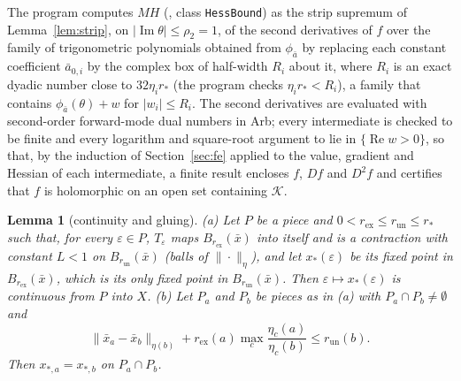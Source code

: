 \documentclass[11pt]{article}
\newtheorem{lemma}{Lemma}[section]
\theoremstyle{definition}
\newcommand{\re}{\operatorname{Re}}
\newcommand{\im}{\operatorname{Im}}
\begin{document}
The program computes $M\!H$ (, class \texttt{HessBound}) as the strip supremum of Lemma~\ref{lem:strip}, on $|\im\theta| \le \rho_2 = 1$, of the second derivatives of $f$ over the family of trigonometric polynomials obtained from $\phi_{\bar a}$ by replacing each constant coefficient $\bar a_{0,i}$ by the complex box of half-width $R_i$ about it, where $R_i$ is an exact dyadic number close to $32\eta_ir_*$ (the program checks $\eta_ir_* < R_i$), a family that contains $\phi_{\bar a}(\theta) + w$ for $|w_i| \le R_i$. The second derivatives are evaluated with second-order forward-mode dual numbers in Arb; every intermediate is checked to be finite and every logarithm and square-root argument to lie in $\{\re w > 0\}$, so that, by the induction of Section~\ref{sec:fe} applied to the value, gradient and Hessian of each intermediate, a finite result encloses $f$, $Df$ and $D^2f$ and certifies that $f$ is holomorphic on an open set containing $\mathcal K$.

\begin{lemma}[continuity and gluing]\label{lem:glue}
(a) Let $P$ be a piece and $0 < r_{\mathrm{ex}} \le r_{\mathrm{un}} \le r_*$ such that, for every $\varepsilon \in P$, $T_\varepsilon$ maps $B_{r_{\mathrm{ex}}}(\bar x)$ into itself and is a contraction with constant $L < 1$ on $B_{r_{\mathrm{un}}}(\bar x)$ (balls of $\|\cdot\|_\eta$), and let $x_*(\varepsilon)$ be its fixed point in $B_{r_{\mathrm{ex}}}(\bar x)$, which is its only fixed point in $B_{r_{\mathrm{un}}}(\bar x)$. Then $\varepsilon \mapsto x_*(\varepsilon)$ is continuous from $P$ into $X$.
(b) Let $P_a$ and $P_b$ be pieces as in (a) with $P_a \cap P_b \ne \emptyset$ and
\begin{equation}\label{eq:glue}
  \|\bar x_a - \bar x_b\|_{\eta(b)} + r_{\mathrm{ex}}(a)\max_c\frac{\eta_c(a)}{\eta_c(b)} \le r_{\mathrm{un}}(b).
\end{equation}
Then $x_{*,a} = x_{*,b}$ on $P_a \cap P_b$.
\end{lemma}
\end{document}
